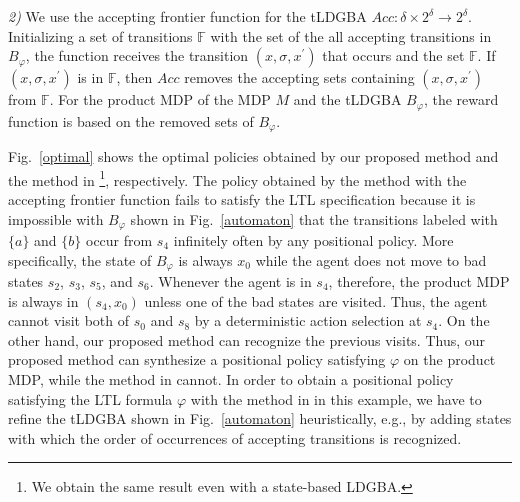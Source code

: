 \textit{2) }
 We use the accepting frontier function \cite{HAK2019,HKAKPL2019} for the tLDGBA $Acc : \delta \times 2^{\delta} \rightarrow 2^{\delta} $. Initializing a set of transitions $ \mathbb{F} $ with the set of the all accepting transitions in $B_{\varphi}$, the function receives the transition $(x, \sigma, x^{\prime})$ that occurs and the set $\mathbb{F}$. If $(x, \sigma, x^{\prime})$ is in $\mathbb{F}$, then $Acc$ removes the accepting sets containing $(x, \sigma, x^{\prime})$ from $\mathbb{F}$. For the product MDP of the MDP $M$ and the tLDGBA $B_{\varphi}$, the reward function is based on the removed sets of $B_{\varphi}$.

Fig.\ \ref{optimal} shows the optimal policies obtained by our proposed method and the method in \cite{HAK2019,HKAKPL2019}\footnote{We obtain the same result even with a state-based LDGBA.}, respectively.
The policy obtained by the method with the accepting frontier function fails to satisfy the LTL specification
because it is impossible with $B_{\varphi}$ shown in Fig.\ \ref{automaton} that the transitions labeled with $\{ a \}$ and $\{ b \}$ occur from $s_4$ infinitely often by any positional policy. More specifically, the state of $B_{\varphi}$ is always $x_0$ while the agent does not move to bad states $s_2$, $s_3$, $s_5$, and $s_6$.
Whenever the agent is in $s_4$, therefore, the product MDP is always in $(s_4, x_0)$ unless one of the bad states are visited.
Thus, the agent cannot visit both of $s_0$ and $s_8$ by a deterministic action selection at $s_4$.
On the other hand, our proposed method can recognize the previous visits.
Thus, our proposed method can synthesize a positional policy satisfying $\varphi$ on the product MDP, while the method in \cite{HAK2019, HKAKPL2019} cannot. In order to obtain a positional policy satisfying the LTL formula $\varphi$ with the method in \cite{HAK2019,HKAKPL2019} in this example, we have to refine the tLDGBA shown in Fig.~\ref{automaton} heuristically, e.g., by adding states with which the order of occurrences of accepting transitions is recognized.
